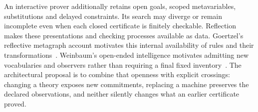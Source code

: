 \documentclass[11pt,a4paper]{article}
\begin{document}
An interactive prover additionally retains open goals, scoped metavariables,
substitutions and delayed constraints. Its search may diverge or remain
incomplete even when each closed certificate is finitely checkable. Reflection
makes these presentations and checking processes available as data. Goertzel's
reflective metagraph account motivates this internal availability of rules and
their transformations~\cite{ReflectiveMetagraph}. Weinbaum's open-ended
intelligence motivates admitting new vocabularies and observers rather than
requiring a final fixed inventory~\cite{WeinbaumThesis}. The architectural
proposal is to combine that openness with explicit crossings: changing a
theory exposes new commitments, replacing a machine preserves the declared
observations, and neither silently changes what an earlier certificate proved.
\end{document}
